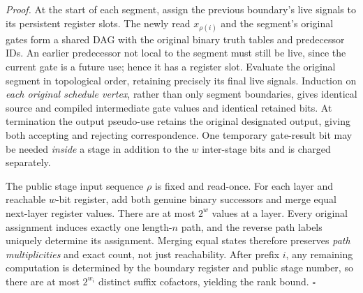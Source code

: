 \documentclass[11pt]{article}
\begin{document}
\emph{Proof.} At the start of each segment, assign the previous boundary's live signals to its persistent register slots. The newly read $x_{\rho(i)}$ and the segment's original gates form a shared DAG with the original binary truth tables and predecessor IDs. An earlier predecessor not local to the segment must still be live, since the current gate is a future use; hence it has a register slot. Evaluate the original segment in topological order, retaining precisely its final live signals. Induction on \emph{each original schedule vertex}, rather than only segment boundaries, gives identical source and compiled intermediate gate values and identical retained bits. At termination the output pseudo-use retains the original designated output, giving both accepting and rejecting correspondence. One temporary gate-result bit may be needed \emph{inside} a stage in addition to the $w$ inter-stage bits and is charged separately.

The public stage input sequence $\rho$ is fixed and read-once. For each layer and reachable $w$-bit register, add both genuine binary successors and merge equal next-layer register values. There are at most $2^w$ values at a layer. Every original assignment induces exactly one length-$n$ path, and the reverse path labels uniquely determine its assignment. Merging equal states therefore preserves \emph{path multiplicities} and exact count, not just reachability. After prefix $i$, any remaining computation is determined by the boundary register and public stage number, so there are at most $2^{w_i}$ distinct suffix cofactors, yielding the rank bound. \hfill$\square$
\end{document}
